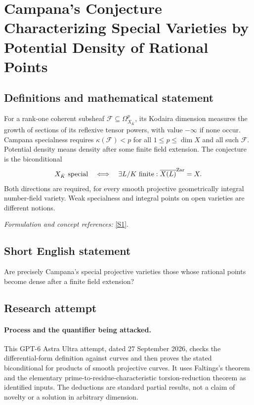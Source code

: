 \documentclass[11pt]{article}
\begin{document}
\section*{\texorpdfstring{Campana's Conjecture Characterizing Special Varieties by Potential Density of Rational Points}{Campana's Conjecture Characterizing Special Varieties by Potential Density of Rational Points}}\label{30006719}
\subsection{Definitions and mathematical statement}
For a rank-one coherent subsheaf $\mathcal F\subseteq\Omega^p_{X_{\bar K}}$, its Kodaira dimension measures the growth of sections of its reflexive tensor powers, with value $-\infty$ if none occur. Campana specialness requires $\kappa(\mathcal F)<p$ for all $1\le p\le\dim X$ and all such $\mathcal F$. Potential density means density after some finite field extension. The conjecture is the biconditional
\[
 X_{\bar K}\text{ special}\quad\Longleftrightarrow\quad
 \exists L/K\text{ finite}:\overline{X(L)}^{\rm Zar}=X.
\]
Both directions are required, for every smooth projective geometrically integral number-field variety. Weak specialness and integral points on open varieties are different notions.
\par\smallskip\textit{Formulation and concept references:} \href{https://arxiv.org/pdf/math/0701105}{[S1]}.

\subsection{Short English statement}
Are precisely Campana's special projective varieties those whose rational points become dense after a finite field extension?
\subsection{Research attempt}
\paragraph{Process and the quantifier being attacked.}
This GPT-6 Astra Ultra attempt, dated 27 September 2026, checks the differential-form definition against curves and then proves the stated biconditional for products of smooth projective curves. It uses Faltings's theorem and the elementary prime-to-residue-characteristic torsion-reduction theorem as identified inputs. The deductions are standard partial results, not a claim of novelty or a solution in arbitrary dimension.
\end{document}
